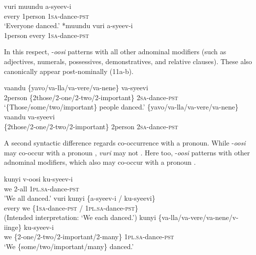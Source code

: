 \documentclass[output=paper]{langsci/langscibook}
\begin{document}
\ea\label{ex:landman:10}
\ea
\gll vuri    muundu  a-syeev-i    \\
     every    1person  1\textsc{sa}-dance-\textsc{pst}       \\
\glt ‘Everyone danced.’
\ex\label{ex:landman:10b}
\gll \textup{*}muundu  vuri    a-syeev-i  \\
     1person    every    1\textsc{sa}-dance-\textsc{pst}    \\
\z
\z

In this respect, -\textit{oosi} patterns with all other adnominal modifiers (such as adjectives, numerals, possessives, demonstratives, and relative clauses). These also canonically appear post-nominally (11a-b). 

\ea\label{ex:landman:11}
\ea
\gll vaandu  \{yavo/va-lla/va-vere/va-nene\}    va-syeevi  \\
     2person  \{2those/2-one/2-two/2-important\} 2\textsc{sa}-dance-\textsc{pst}\\
\glt ‘\{Those/some/two/important\} people danced.’
\ex\label{ex:landman:11b}
\gll *\{yavo/va-lla/va-vere/va-nene\}  vaandu   va-syeevi\\
     \{2those/2-one/2-two/2-important\}  2person  2\textsc{sa}-dance-\textsc{pst}\\
\z
\z

A second syntactic difference regards co-occurrence with a pronoun. While -\textit{oosi} may co-occur with a pronoun , \textit{vuri} may not . Here too, -\textit{oosi} patterns with other adnominal modifiers, which also may co-occur with a pronoun .

\ea\label{ex:landman:12}
\ea\label{ex:landman:12a}
\gll kunyi  v-oosi    ku-syeev-i      \\
     we  2-all    1\textsc{pl}.\textsc{sa}-dance-\textsc{pst}\\
\glt 'We all danced.'
\ex\label{ex:landman:12b}
\gll *vuri  kunyi    \{a-syeev-i / ku-syeevi\}  \\
     every  we    \{1\textsc{sa}-dance-\textsc{pst} / 1\textsc{pl}.\textsc{sa}-dance-\textsc{pst\}}\\
\glt (Intended interpretation: ‘We each danced.’)
\ex\label{ex:landman:12c}
\gll kunyi \{va-lla/va-vere/va-nene/v-iinge\}     ku-syeev-i\\
     we    \{2-one/2-two/2-important/2-many\} 1\textsc{pl}.\textsc{sa}-dance-\textsc{pst}\\
\glt ‘We \{some/two/important/many\} danced.’
\z
\z
\end{document}
